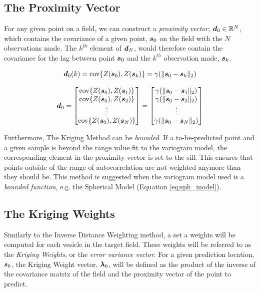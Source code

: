 \subsection{The Proximity Vector} \label{sec:proxvect}
For any given point on a field, we can construct a \textit{proximity vector}, ${\it{\boldsymbol{d}}}_0 \in \mathbb{R}^N$, which contains the covariance of a given point, ${\it{\boldsymbol{s}}}_0$ on the field with the $N$ observations made. The $k^{th}$ element of ${\it{\boldsymbol{d}}}_N$, would therefore contain the covariance for the lag between point ${\it{\boldsymbol{s}}}_0$ and the $k^{th}$ observation made, ${\it{\boldsymbol{s}}}_k$.

$${\it{\boldsymbol{d}}}_0(k) = \text{cov}\{Z({\it{\boldsymbol{s}}}_0), Z({\it{\boldsymbol{s}}}_k)\} = \gamma(\| {\it{\boldsymbol{s}}}_0 - {\it{\boldsymbol{s}}}_k \|_2)$$

\begin{equation}
    {\it{\boldsymbol{d}}}_0 = \begin{bmatrix} 
                    \text{cov}\{Z({\it{\boldsymbol{s}}}_0), Z({\it{\boldsymbol{s}}}_1)\} \\
                    \text{cov}\{Z({\it{\boldsymbol{s}}}_0), Z({\it{\boldsymbol{s}}}_2)\} \\
                     \vdots \\
                    \text{cov}\{Z({\it{\boldsymbol{s}}}_0), Z({\it{\boldsymbol{s}}}_N)\} \\
        \end{bmatrix} = 
        \begin{bmatrix} 
                    \gamma(\| {\it{\boldsymbol{s}}}_0 - {\it{\boldsymbol{s}}}_1 \|_2) \\
                    \gamma(\| {\it{\boldsymbol{s}}}_0 - {\it{\boldsymbol{s}}}_2 \|_2) \\
                     \vdots \\
                    \gamma(\| {\it{\boldsymbol{s}}}_0 - {\it{\boldsymbol{s}}}_N \|_2) \\
        \end{bmatrix} 
    \label{eq:proxvect}
\end{equation}

Furthermore, The Kriging Method can be \textit{bounded}. If a to-be-predicted point and a given sample is beyond the range value fit to the variogram model, the corresponding element in the proximity vector is set to the sill. This ensures that points outside of the range of autocorrelation are not weighted anymore than they should be. This method is suggested when the variogram model used is a \textit{bounded function}, e.g. the Spherical Model (Equation \ref{eq:sph_model}).

\subsection{The Kriging Weights} \label{sec:krigweights}
Similarly to the Inverse Distance Weighting method, a set a weights will be computed for each vesicle in the target field. These weights will be referred to as the \textit{Kriging Weights}, or the \textit{error variance vector}. For a given prediction location, ${\it{\boldsymbol{s}}}_0$, the Kriging Weight vector, ${\it{\boldsymbol{\lambda}}}_0$, will be defined as the product of the inverse of the covariance matrix of the field and the proximity vector of the point to predict.

